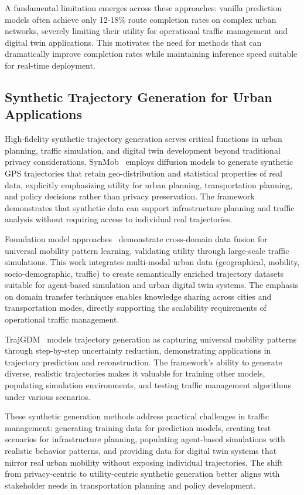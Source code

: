 A fundamental limitation emerges across these approaches: vanilla prediction models often achieve only 12-18\% route completion rates on complex urban networks, severely limiting their utility for operational traffic management and digital twin applications. This motivates the need for methods that can dramatically improve completion rates while maintaining inference speed suitable for real-time deployment.

\subsection{Synthetic Trajectory Generation for Urban Applications}
\label{sec:lit-synthetic-urban}

High-fidelity synthetic trajectory generation serves critical functions in urban planning, traffic simulation, and digital twin development beyond traditional privacy considerations. SynMob~\cite{zhuSynMobCreatingHighfidelity} employs diffusion models to generate synthetic GPS trajectories that retain geo-distribution and statistical properties of real data, explicitly emphasizing utility for urban planning, transportation planning, and policy decisions rather than privacy preservation. The framework demonstrates that synthetic data can support infrastructure planning and traffic analysis without requiring access to individual real trajectories.

Foundation model approaches~\cite{maLearningUniversalHuman2025} demonstrate cross-domain data fusion for universal mobility pattern learning, validating utility through large-scale traffic simulations. This work integrates multi-modal urban data (geographical, mobility, socio-demographic, traffic) to create semantically enriched trajectory datasets suitable for agent-based simulation and urban digital twin systems. The emphasis on domain transfer techniques enables knowledge sharing across cities and transportation modes, directly supporting the scalability requirements of operational traffic management.

TrajGDM~\cite{chuSimulatingHumanMobility2024} models trajectory generation as capturing universal mobility patterns through step-by-step uncertainty reduction, demonstrating applications in trajectory prediction and reconstruction. The framework's ability to generate diverse, realistic trajectories makes it valuable for training other models, populating simulation environments, and testing traffic management algorithms under various scenarios.

These synthetic generation methods address practical challenges in traffic management: generating training data for prediction models, creating test scenarios for infrastructure planning, populating agent-based simulations with realistic behavior patterns, and providing data for digital twin systems that mirror real urban mobility without exposing individual trajectories. The shift from privacy-centric to utility-centric synthetic generation better aligns with stakeholder needs in transportation planning and policy development.

